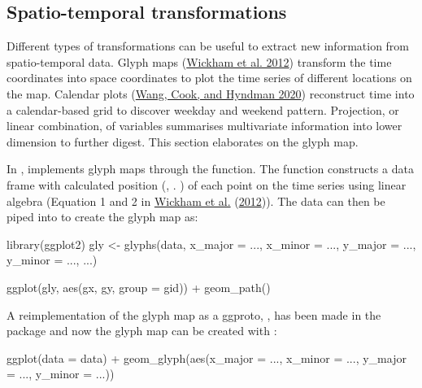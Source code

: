 \documentclass{article}
\newenvironment{Shaded}{\begin{snugshade}}{\end{snugshade}}
\newcommand{\AttributeTok}[1]{\textcolor[rgb]{0.77,0.63,0.00}{#1}}
\newcommand{\FunctionTok}[1]{\textcolor[rgb]{0.00,0.00,0.00}{#1}}
\newcommand{\NormalTok}[1]{#1}
\newcommand{\OtherTok}[1]{\textcolor[rgb]{0.56,0.35,0.01}{#1}}
\newcommand{\SpecialCharTok}[1]{\textcolor[rgb]{0.00,0.00,0.00}{#1}}
\begin{document}
\hypertarget{st_transformation}{%
\subsection{Spatio-temporal transformations}\label{st_transformation}}

Different types of transformations can be useful to extract new information from spatio-temporal data. Glyph maps (\protect\hyperlink{ref-Wickham2012-yr}{Wickham et al. 2012}) transform the time coordinates into space coordinates to plot the time series of different locations on the map. Calendar plots (\protect\hyperlink{ref-wang2020calendar}{Wang, Cook, and Hyndman 2020}) reconstruct time into a calendar-based grid to discover weekday and weekend pattern. Projection, or linear combination, of variables summarises multivariate information into lower dimension to further digest. This section elaborates on the glyph map.

In ,  implements glyph maps through the  function. The function constructs a data frame with calculated position (, . ) of each point on the time series using linear algebra (Equation 1 and 2 in \protect\hyperlink{ref-Wickham2012-yr}{Wickham et al.} (\protect\hyperlink{ref-Wickham2012-yr}{2012})). The data can then be piped into  to create the glyph map as:

\begin{Shaded}
\begin{Highlighting}[]
\FunctionTok{library}\NormalTok{(ggplot2)}
\NormalTok{gly }\OtherTok{\textless{}{-}} \FunctionTok{glyphs}\NormalTok{(data,}
              \AttributeTok{x\_major =}\NormalTok{ ..., }\AttributeTok{x\_minor =}\NormalTok{ ...,}
              \AttributeTok{y\_major =}\NormalTok{ ..., }\AttributeTok{y\_minor =}\NormalTok{ ..., ...)}

\FunctionTok{ggplot}\NormalTok{(gly, }\FunctionTok{aes}\NormalTok{(gx, gy, }\AttributeTok{group =}\NormalTok{ gid)) }\SpecialCharTok{+}
  \FunctionTok{geom\_path}\NormalTok{()}
\end{Highlighting}
\end{Shaded}

A reimplementation of the glyph map as a ggproto, , has been made in the  package and now the glyph map can be created with :

\begin{Shaded}
\begin{Highlighting}[]
\FunctionTok{ggplot}\NormalTok{(}\AttributeTok{data =}\NormalTok{ data) }\SpecialCharTok{+}
  \FunctionTok{geom\_glyph}\NormalTok{(}\FunctionTok{aes}\NormalTok{(}\AttributeTok{x\_major =}\NormalTok{ ..., }\AttributeTok{x\_minor =}\NormalTok{ ...,}
                 \AttributeTok{y\_major =}\NormalTok{ ..., }\AttributeTok{y\_minor =}\NormalTok{ ...))}
\end{Highlighting}
\end{Shaded}
\end{document}
